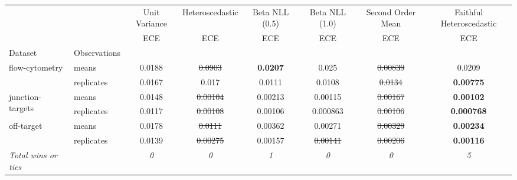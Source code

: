 \begin{tabular}{ll|c|c|c|c|c|c}
\toprule
{} & {} & {Unit Variance} & {Heteroscedastic} & {Beta NLL (0.5)} & {Beta NLL (1.0)} & {Second Order Mean} & {Faithful Heteroscedastic} \\
{} & {} & {ECE} & {ECE} & {ECE} & {ECE} & {ECE} & {ECE} \\
{Dataset} & {Observations} & {} & {} & {} & {} & {} & {} \\
\midrule
\multirow[t]{2}{*}{flow-cytometry} & means & 0.0188 & \sout{0.0903} & \textbf{0.0207} & 0.025 & \sout{0.00839} & 0.0209 \\
 & replicates & 0.0167 & 0.017 & 0.0111 & 0.0108 & \sout{0.0134} & \textbf{0.00775} \\
\multirow[t]{2}{*}{junction-targets} & means & 0.0148 & \sout{0.00104} & 0.00213 & 0.00115 & \sout{0.00167} & \textbf{0.00102} \\
 & replicates & 0.0117 & \sout{0.00108} & 0.00106 & 0.000863 & \sout{0.00106} & \textbf{0.000768} \\
\multirow[t]{2}{*}{off-target} & means & 0.0178 & \sout{0.0111} & 0.00362 & 0.00271 & \sout{0.00329} & \textbf{0.00234} \\
 & replicates & 0.0139 & \sout{0.00275} & 0.00157 & \sout{0.00141} & \sout{0.00206} & \textbf{0.00116} \\
\textit{{Total wins or ties}} &  & \textit{0} & \textit{0} & \textit{1} & \textit{0} & \textit{0} & \textit{5} \\
\bottomrule
\end{tabular}
